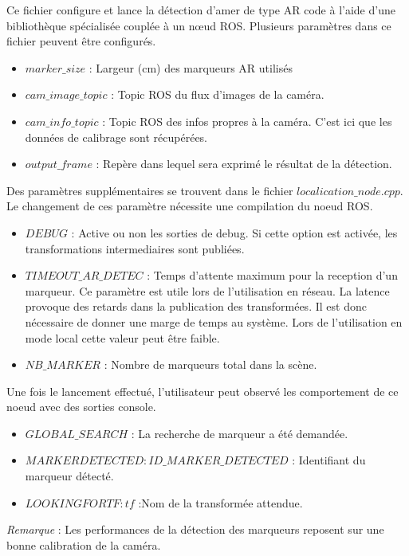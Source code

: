 \documentclass[10pt,a4paper]{article}
\begin{document}
Ce fichier configure et lance la détection d'amer de type AR code à l'aide d'une bibliothèque spécialisée couplée à un nœud ROS. 
Plusieurs paramètres dans ce fichier peuvent être configurés.
\begin{itemize}
\item $marker\_size$ : Largeur (cm) des marqueurs AR utilisés
\item $cam\_image\_topic$ : Topic ROS du flux d'images de la caméra.
\item $cam\_info\_topic$ : Topic ROS des infos propres à la caméra. C'est ici que les données de calibrage sont récupérées.
\item $output\_frame$ : Repère dans lequel sera exprimé le résultat de la détection.\\
\end{itemize}
Des paramètres supplémentaires se trouvent dans le fichier $localication\_node.cpp$. Le changement de ces paramètre nécessite une compilation du noeud ROS.
\begin{itemize}
\item $DEBUG$ : Active ou non les sorties de debug. Si cette option est activée, les transformations intermediaires sont publiées.
\item $TIMEOUT\_AR\_DETEC$ : Temps d'attente maximum pour la reception d'un marqueur. Ce paramètre est utile lors de l'utilisation en réseau. La latence provoque des retards dans la publication des transformées. Il est donc nécessaire de donner une marge de temps au système. Lors de l'utilisation en mode local cette valeur peut \^etre faible.
\item $NB\_MARKER$ : Nombre de marqueurs total dans la scène.\\
\end{itemize}

Une fois le lancement effectué, l'utilisateur peut observé les comportement de ce noeud avec des sorties console.
\begin{itemize}
\item $GLOBAL\_SEARCH$ : La recherche de marqueur a été demandée.
\item $ MARKER DETECTED: ID\_MARKER\_DETECTED$ : Identifiant du marqueur détecté.
\item $LOOKING FOR TF: tf$ :Nom de la transformée attendue.\\
\end{itemize}

\textit{Remarque} : Les performances de la détection des marqueurs reposent sur une bonne calibration de la caméra.
\end{document}
